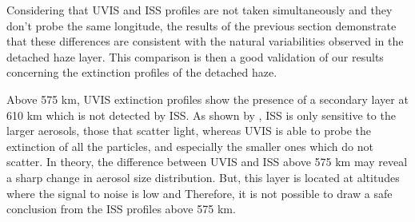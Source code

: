Considering that UVIS and ISS profiles are not taken simultaneously and
they don't probe the same longitude, the results of the previous section demonstrate that these differences are
consistent with the natural variabilities observed in the detached haze layer.
This comparison is then a good validation of our results concerning the extinction profiles of the detached haze.

Above 575 km, UVIS extinction profiles show the presence of a secondary layer at 610 km which is not detected
by ISS. As shown by \cite{Cours2011}, ISS is only sensitive to the larger aerosols, those that scatter light, whereas
UVIS is able to probe the extinction of all the particles, and especially the smaller ones which do not scatter.
In theory, the difference between UVIS and ISS above 575 km may reveal a sharp change in aerosol size distribution.
But, this layer is located at altitudes where the signal to noise is low and 
Therefore, it is not possible to draw a safe conclusion from the ISS profiles above 575 km.
